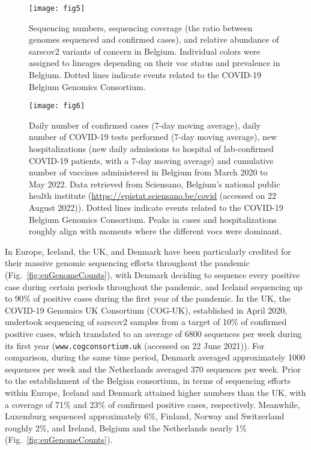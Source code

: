 \begin{figure}[ht]
  \centering
  \texttt{[image: fig5]}
  \caption[Belgian sequencing coverage]{Sequencing numbers, sequencing coverage (the ratio between genomes sequenced and confirmed cases), and relative abundance of \gls{sarscov2} variants of concern in Belgium.
  Individual colors were assigned to lineages depending on their \gls{voc} status and prevalence in Belgium.
  Dotted lines indicate events related to the COVID-19 Belgium Genomics Consortium.}
  \label{fig:beSeqCoverage}
\end{figure}

\begin{figure}[!ht]
  \centering
  \texttt{[image: fig6]}
  \caption[Confirmed cases, tests, hospitalizations, \& vaccinations]{Daily number of confirmed cases (7-day moving average), daily number of COVID-19 tests performed (7-day moving average), new hospitalizations (new daily admissions to hospital of lab-confirmed COVID-19 patients, with a 7-day moving average) and cumulative number of vaccines administered in Belgium from March 2020 to May 2022. Data retrieved from Sciensano, Belgium's national public health institute (\url{https://epistat.sciensano.be/covid} (accessed on 22 August 2022)). Dotted lines indicate events related to the COVID-19 Belgium Genomics Consortium. Peaks in cases and hospitalizations roughly align with moments where the different \gls{voc}s were dominant.}
  \label{fig:beCasesSciensano}
\end{figure}

In Europe, Iceland, the UK, and Denmark have been particularly credited for their massive genomic sequencing efforts throughout the pandemic (Fig.~\ref{fig:euGenomeCounts}), with Denmark deciding to sequence every positive case during certain periods throughout the pandemic, and Iceland sequencing up to 90\% of positive cases during the first year of the pandemic.
In the UK, the COVID-19 Genomics UK Consortium (COG-UK), established in April 2020, undertook sequencing of \gls{sarscov2} samples from a target of 10\% of confirmed positive cases, which translated to an average of 6800 sequences per week during its first year (\verb|www.cogconsortium.uk| (accessed on 22 June 2021)).
For comparison, during the same time period, Denmark averaged approximately 1000 sequences per week and the Netherlands averaged 370 sequences per week.
Prior to the establishment of the Belgian consortium, in terms of sequencing efforts within Europe, Iceland and Denmark attained higher numbers than the UK, with a coverage of 71\% and 23\% of confirmed positive cases, respectively.
Meanwhile, Luxemburg sequenced approximately 6\%, Finland, Norway and Switzerland roughly 2\%, and Ireland, Belgium and the Netherlands nearly 1\% (Fig.~\ref{fig:euGenomeCounts}).

